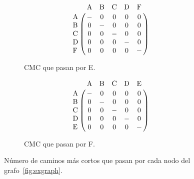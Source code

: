 \begin{figure}[htpb]
\begin{subfigure}[b]{.3\textwidth}
  \end{subfigure}
  \hspace{3mm}
  \begin{subfigure}[b]{.3\textwidth}
    \begin{equation*}
      \bordermatrix{
       ~  & $A$ & $B$ & $C$ & $D$ & $F$ \cr
      $A$ &  -  &  0  &  0  &  0  &  0  \cr
      $B$ &  0  &  -  &  0  &  0  &  0  \cr
      $C$ &  0  &  0  &  -  &  0  &  0  \cr
      $D$ &  0  &  0  &  0  &  -  &  0  \cr
      $F$ &  0  &  0  &  0  &  0  &  -  \cr
    }
    \end{equation*}
    \caption{CMC que pasan por E.}
    \label{fig:sppn:e}
  \end{subfigure}
  \hspace{3mm}
  \begin{subfigure}[b]{.3\textwidth}
    \begin{equation*}
      \bordermatrix{
       ~  & $A$ & $B$ & $C$ & $D$ & $E$ \cr
      $A$ &  -  &  0  &  0  &  0  &  0  \cr
      $B$ &  0  &  -  &  0  &  0  &  0  \cr
      $C$ &  0  &  0  &  -  &  0  &  0  \cr
      $D$ &  0  &  0  &  0  &  -  &  0  \cr
      $E$ &  0  &  0  &  0  &  0  &  -  \cr
    }
    \end{equation*}
    \caption{CMC que pasan por F.}
    \label{fig:sppn:f}
  \end{subfigure}
  \caption{Número de caminos más cortos que pasan por cada nodo del
  grafo~\ref{fig:exgraph}.}
  \label{fig:sppn}
\end{figure}
